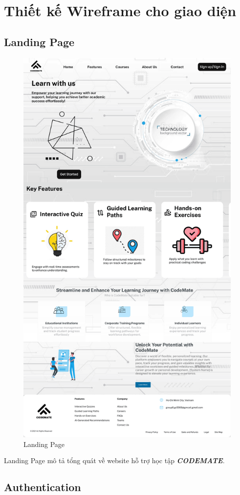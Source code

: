 \section{Thiết kế Wireframe cho giao diện}
\subsection{Landing Page}
\begin{figure}[H]
    \centering
    \includegraphics[width=0.7\linewidth]{Images/figmaDesign/Landing Page.png}
    \caption{Landing Page}
    \label{fig:enter-label}
\end{figure}
Landing Page mô tả tổng quát về website hỗ trợ học tập \textbf{\textit{CODEMATE}}.
\subsection{Authentication}
